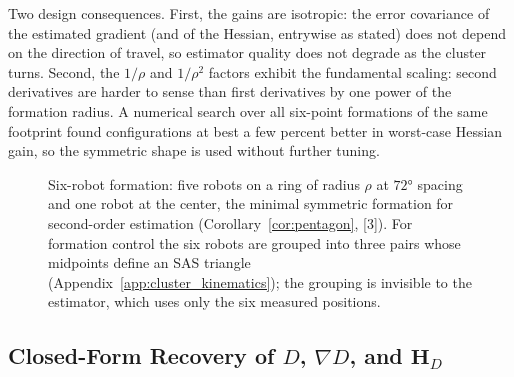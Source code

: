 \documentclass[12pt, letterpaper, oneside]{report}
\begin{document}
Two design consequences. First, the gains are isotropic: the error
covariance of the estimated gradient (and of the Hessian, entrywise as
stated) does not depend on the direction of travel, so estimator quality
does not degrade as the cluster turns. Second, the $1/\rho$ and
$1/\rho^2$ factors exhibit the fundamental scaling: second derivatives are
harder to sense than first derivatives by one power of the formation
radius. A numerical search over all six-point formations of the same
footprint found configurations at best a few percent better in worst-case
Hessian gain, so the symmetric shape is used without further tuning.

\begin{figure}[!t]
\centering
\framebox[0.9\linewidth]{\rule{0pt}{3.0cm}}
\caption{Six-robot formation: five robots on a ring of radius $\rho$ at
$72°$ spacing and one robot at the center, the minimal symmetric
formation for second-order estimation (Corollary~\ref{cor:pentagon}, [3]).
For formation control the six robots are grouped into three pairs whose
midpoints define an SAS triangle (Appendix~\ref{app:cluster_kinematics});
the grouping is invisible to the estimator, which uses only the six
measured positions.}
\label{fig:pentagon_formation}
\end{figure}

\subsection{Closed-Form Recovery of \texorpdfstring{$D$}{D}, \texorpdfstring{$\nabla D$}{grad D}, and \texorpdfstring{$\mathbf{H}_D$}{H\_D}}
\end{document}
